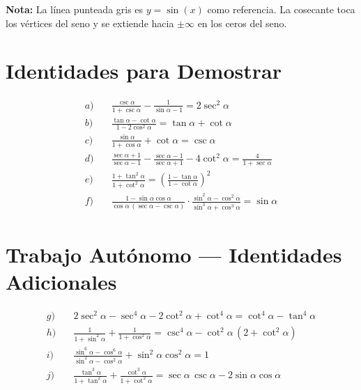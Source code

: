 \documentclass[12pt,a4paper]{article}
\begin{document}
\begin{tcolorbox}[notabox]
\textbf{Nota:} La línea punteada gris es $y=\sin(x)$ como referencia.
La cosecante toca los vértices del seno y se extiende hacia $\pm\infty$
en los ceros del seno.
\end{tcolorbox}

\newpage

\section{Identidades para Demostrar}

\begin{tcolorbox}[ejercbox,
  title={\color{dorado}\bfseries Ejercicios en clases}]
\begin{align*}
a)\quad
  &\frac{\csc\alpha}{1+\csc\alpha}
   - \frac{1}{\sin\alpha-1} = 2\sec^2\alpha \\[8pt]
b)\quad
  &\frac{\tan\alpha-\cot\alpha}{1-2\cos^2\alpha}
   = \tan\alpha+\cot\alpha \\[8pt]
c)\quad
  &\frac{\sin\alpha}{1+\cos\alpha}+\cot\alpha = \csc\alpha \\[8pt]
d)\quad
  &\frac{\sec\alpha+1}{\sec\alpha-1}
   -\frac{\sec\alpha-1}{\sec\alpha+1}
   -4\cot^2\alpha
   = \frac{4}{1+\sec\alpha} \\[8pt]
e)\quad
  &\frac{1+\tan^2\alpha}{1+\cot^2\alpha}
   = \left(\frac{1-\tan\alpha}{1-\cot\alpha}\right)^{\!2} \\[8pt]
f)\quad
  &\frac{1-\sin\alpha\cos\alpha}{\cos\alpha\,(\sec\alpha-\csc\alpha)}
   \cdot
   \frac{\sin^2\alpha-\cos^2\alpha}{\sin^3\alpha+\cos^3\alpha}
   = \sin\alpha
\end{align*}
\end{tcolorbox}

\section{Trabajo Autónomo --- Identidades Adicionales}

\begin{tcolorbox}[ejercbox,
  title={\color{dorado}\bfseries Trabajo autónomo}]
\begin{align*}
g)\quad
  &2\sec^2\alpha - \sec^4\alpha - 2\cot^2\alpha + \cot^4\alpha
   = \cot^4\alpha - \tan^4\alpha \\[8pt]
h)\quad
  &\frac{1}{1+\sin^2\alpha}+\frac{1}{1+\cos^2\alpha}
   = \csc^4\alpha - \cot^2\alpha\,(2+\cot^2\alpha) \\[8pt]
i)\quad
  &\frac{\sin^6\alpha-\cos^6\alpha}{\sin^2\alpha-\cos^2\alpha}
   +\sin^2\alpha\cos^2\alpha = 1 \\[8pt]
j)\quad
  &\frac{\tan^3\alpha}{1+\tan^2\alpha}
   +\frac{\cot^3\alpha}{1+\cot^2\alpha}
   = \sec\alpha\,\csc\alpha - 2\sin\alpha\cos\alpha
\end{align*}
\end{tcolorbox}
\end{document}
